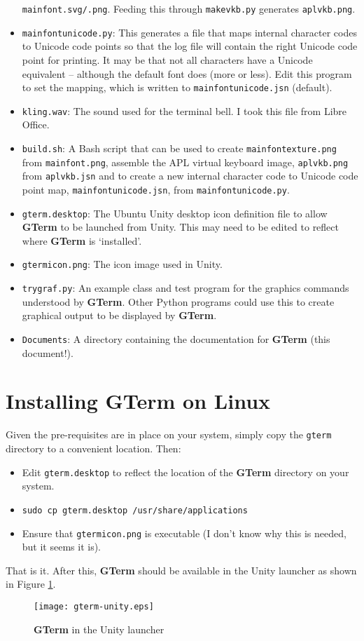 \documentclass[a4paper,twoside,11pt]{article}
\makeatletter
\def\maxwidth{%
  \ifdim\Gin@nat@width>\linewidth
    \linewidth
  \else
    \Gin@nat@width
  \fi
}
\makeatother
\begin{document}
\begin{itemize}
      \texttt{mainfont.svg/.png}. Feeding this through \texttt{makevkb.py} generates \texttt{aplvkb.png}.
\item \texttt{mainfontunicode.py}: This generates a file that maps internal character codes to Unicode code points so that
      the log file will contain the right Unicode code point for printing. It may be that not all characters have 
      a Unicode equivalent -- although the default font does (more or less). Edit this program to set the mapping,
      which is written to \texttt{mainfontunicode.jsn} (default).
\item \texttt{kling.wav}: The sound used for the terminal bell. I took this file from Libre Office.
\item \texttt{build.sh}: A Bash script that can be used to create \texttt{mainfontexture.png}
      from \texttt{mainfont.png}, assemble the APL virtual
      keyboard image, \texttt{aplvkb.png} from \texttt{aplvkb.jsn} and to create a new internal 
      character code to Unicode code point map,
      \texttt{mainfontunicode.jsn}, from \texttt{mainfontunicode.py}.
\item \texttt{gterm.desktop}: The Ubuntu Unity desktop icon definition file to allow \textbf{GTerm} to be launched from Unity. This may
      need to be edited to reflect where \textbf{GTerm} is `installed'.
\item \texttt{gtermicon.png}: The icon image used in Unity.
\item \texttt{trygraf.py}: An example class and test program for the graphics commands understood by \textbf{GTerm}.
      Other Python programs could use this to create graphical output to be displayed by \textbf{GTerm}.
\item \texttt{Documents}: A directory containing the documentation for \textbf{GTerm} (this document!).
\end{itemize}

\section{Installing \textbf{GTerm} on Linux}
Given the pre-requisites are in place on your system, simply copy the \texttt{gterm} directory to a convenient location.
Then:
\begin{itemize}
\item Edit \texttt{gterm.desktop} to reflect the location of the \textbf{GTerm} directory on your system.
\item \texttt{sudo cp gterm.desktop /usr/share/applications}
\item Ensure that \texttt{gtermicon.png} is executable (I don't know why this is needed, but it seems it is).
\end{itemize}
That is it. After this, \textbf{GTerm} should be available in the Unity launcher as shown in Figure \ref{fig:gtermunity}.
\begin{figure}
	\centering
		\texttt{[image: gterm-unity.eps]}
	\caption{\textbf{GTerm} in the Unity launcher}
	\label{fig:gtermunity}
\end{figure}
\end{document}
